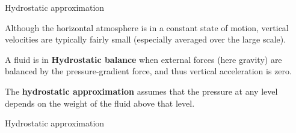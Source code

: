 \documentclass[aspectratio=169,xcolor=dvipsnames]{beamer}
\begin{document}
{

\begin{frame}{Hydrostatic approximation}

Although the horizontal atmosphere is in a
constant state of motion, vertical velocities
are typically fairly small (especially averaged
over the large scale).
\vspace{2em}
\begin{definition}
    A fluid is in \textbf{Hydrostatic balance} when external forces (here gravity) are balanced by the pressure-gradient force, and thus vertical acceleration is zero.
\end{definition}
\vspace{2em}
The \textbf{hydrostatic approximation} assumes that the pressure at any level depends on the weight of the fluid above that level.



\end{frame}

\begin{frame}{Hydrostatic approximation}


\end{frame}}
\end{document}
